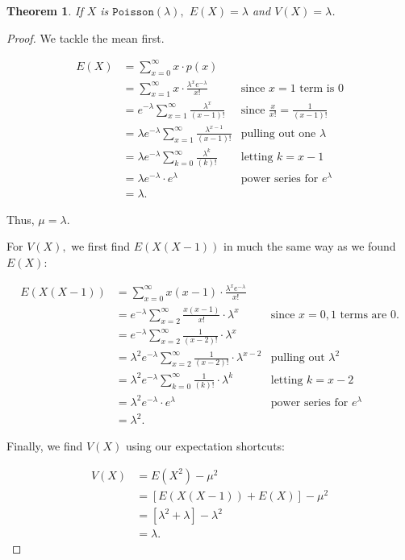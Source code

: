 \documentclass[
]{book}
\newtheorem{theorem}{Theorem}[chapter]
\theoremstyle{definition}
\theoremstyle{definition}
\theoremstyle{definition}
\theoremstyle{definition}
\theoremstyle{remark}
\begin{document}
\begin{theorem}
\protect\hypertarget{thm:poisson-EandV}{}\label{thm:poisson-EandV}If \(X\) is \(\texttt{Poisson}(\lambda),\) \(E(X) = \lambda\) and \(V(X) = \lambda\).
\end{theorem}

\begin{proof}
We tackle the mean first.

\begin{align*} 
E(X) &= \sum_{x=0}^\infty x \cdot p(x) \\
     &= \sum_{x=1}^\infty x \cdot \frac{\lambda^x e^{-\lambda}}{x!} & \text{since }x=1 \text{ term is } 0\\
     &= e^{-\lambda} \sum_{x=1}^\infty \frac{\lambda^x}{(x-1)!} & \text{since } \frac{x}{x!}=\frac{1}{(x-1)!}\\
     &= \lambda e^{-\lambda} \sum_{x=1}^\infty \frac{\lambda^{x-1}}{(x-1)!} & \text{pulling out one }\lambda \\
     &= \lambda e^{-\lambda} \sum_{k=0}^\infty \frac{\lambda^{k}}{(k)!} & \text{letting }  k = x-1\\
     &= \lambda e^{-\lambda}\cdot e^{\lambda} &\text{power series for }e^\lambda\\
     &= \lambda.
\end{align*}

Thus, \(\mu = \lambda\).

For \(V(X),\) we first find \(E(X(X-1))\) in much the same way as we found \(E(X)\):

\begin{align*}
E(X(X-1)) &= \sum_{x=0}^\infty x(x-1)\cdot \frac{\lambda^x e^{-\lambda}}{x!} \\
    &= e^{-\lambda} \sum_{x=2}^\infty \frac{x(x-1)}{x!} \cdot \lambda^x & \text{since }x=0,1 \text{ terms are }0. \\
    &= e^{-\lambda} \sum_{x=2}^\infty \frac{1}{(x-2)!} \cdot \lambda^x\\
    &= \lambda^2 e^{-\lambda} \sum_{x=2}^\infty \frac{1}{(x-2)!} \cdot \lambda^{x-2}  & \text{pulling out }\lambda^2 \\
    &= \lambda^2 e^{-\lambda} \sum_{k=0}^\infty \frac{1}{(k)!} \cdot \lambda^{k} &\text{letting }k=x-2\\
    &= \lambda^2 e^{-\lambda} \cdot e^{\lambda}  & \text{power series for }e^\lambda\\
    &= \lambda^2.
\end{align*}

Finally, we find \(V(X)\) using our expectation shortcuts:

\begin{align*}
V(X) &= E(X^2) - \mu^2 \\
  &= [E(X(X-1))+E(X)] - \mu^2 \\
  &= [\lambda^2 + \lambda] - \lambda^2 \\
  &= \lambda.
\end{align*}
\end{proof}
\end{document}
